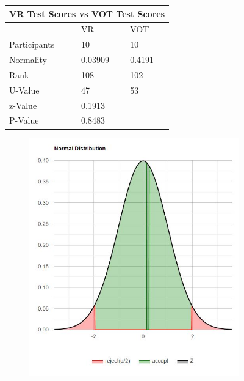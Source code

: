 \documentclass[manuscript]{./Models/acmart}
\begin{document}
\begin{figure}[!h]
    \centering
    \begin{subtable}[b]{.5\textwidth}
        \begin{tabular}{|p{}||p{}|p{}|}
            \hline
            \multicolumn{3}{|c|}{VR Test Scores vs VOT Test Scores}\\
            \hline\hline
             & VR & VOT \\
            \hline
            Participants & 10 & 10\\            
            \hline
            Normality & \cellcolor{red!75}0.03909 & \cellcolor{green!75}0.4191\\
            \hline
            Rank & 108 & 102\\
            \hline
            U-Value & 47 & 53\\
            \hline\hline
            z-Value & 0.1913 &\\
            \hline
            P-Value & 0.8483 &\\
            \hline
        \end{tabular}
        \newline\newline
        \newline\newline
        \caption{Mann-Whitney U statistical analysis of training methods on assessment scores}
        \label{tab:MWTable1}
    \end{subtable}
    \hfill
    \begin{subfigure}[b]{.4\textwidth}
        \centering
        \includegraphics[width=\textwidth]{Photos/VR vs VOT group MWU test.jpg}

\end{subfigure}
\end{figure}
\end{document}
